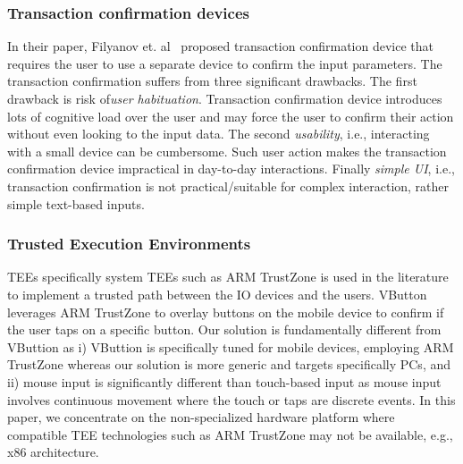 \subsubsection{\bfseries Transaction confirmation devices} In their paper, Filyanov et. al~\cite{filyanov2011uni} proposed transaction confirmation device that requires the user to use a separate device to confirm the input parameters. The transaction confirmation suffers from three significant drawbacks. The first drawback is risk of\emph{user habituation}. Transaction confirmation device introduces lots of cognitive load over the user and may force the user to confirm their action without even looking to the input data. The second \emph{usability}, i.e., interacting with a small device can be cumbersome. Such user action makes the transaction confirmation device impractical in day-to-day interactions. Finally \emph{simple UI}, i.e., transaction confirmation is not practical/suitable for complex interaction, rather simple text-based inputs. 



\subsubsection{\bfseries Trusted Execution Environments} TEEs specifically system TEEs such as ARM TrustZone is used in the literature to implement a trusted path between the IO devices and the users. %
VButton~\cite{li2018vbutton} leverages ARM TrustZone to overlay buttons on the mobile device to confirm if the user taps on a specific button. Our solution is fundamentally different from VButtion as i) VButtion is specifically tuned for mobile devices, employing ARM TrustZone whereas our solution is more generic and targets specifically PCs, and ii) mouse input is significantly different than touch-based input as mouse input involves continuous movement where the touch or taps are discrete events. In this paper, we concentrate on the non-specialized hardware platform where compatible TEE technologies such as ARM TrustZone may not be available, e.g., x86 architecture. 

